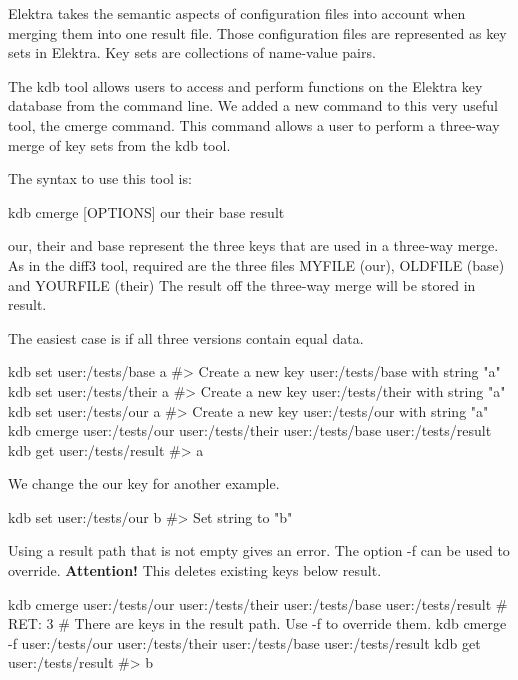 Elektra takes the semantic aspects of configuration files into account when merging them into one result file. Those configuration files are represented as key sets in Elektra. Key sets are collections of name-\/value pairs.

The {\ttfamily kdb} tool allows users to access and perform functions on the Elektra key database from the command line. We added a new command to this very useful tool, the {\ttfamily cmerge} command. This command allows a user to perform a three-\/way merge of key sets from the {\ttfamily kdb} tool.

The syntax to use this tool is\+:

{\ttfamily kdb cmerge \mbox{[}O\+P\+T\+I\+O\+NS\mbox{]} our their base result}

{\ttfamily our}, {\ttfamily their} and {\ttfamily base} represent the three keys that are used in a three-\/way merge. As in the {\ttfamily diff3} tool, required are the three files M\+Y\+F\+I\+LE (our), O\+L\+D\+F\+I\+LE (base) and Y\+O\+U\+R\+F\+I\+LE (their) The result off the three-\/way merge will be stored in {\ttfamily result}.

The easiest case is if all three versions contain equal data.


\begin{DoxyCode}
kdb set user:/tests/base a
#> Create a new key user:/tests/base with string "a"
kdb set user:/tests/their a
#> Create a new key user:/tests/their with string "a"
kdb set user:/tests/our a
#> Create a new key user:/tests/our with string "a"
kdb cmerge user:/tests/our user:/tests/their user:/tests/base user:/tests/result
kdb get user:/tests/result
#> a
\end{DoxyCode}


We change the our key for another example.


\begin{DoxyCode}
kdb set user:/tests/our b
#> Set string to "b"
\end{DoxyCode}


Using a {\ttfamily result} path that is not empty gives an error. The option {\ttfamily -\/f} can be used to override. {\bfseries Attention!} This deletes existing keys below {\ttfamily result}.


\begin{DoxyCode}
kdb cmerge user:/tests/our user:/tests/their user:/tests/base user:/tests/result
# RET: 3
# There are keys in the result path. Use -f to override them.
kdb cmerge -f user:/tests/our user:/tests/their user:/tests/base user:/tests/result
kdb get user:/tests/result
#> b
\end{DoxyCode}


